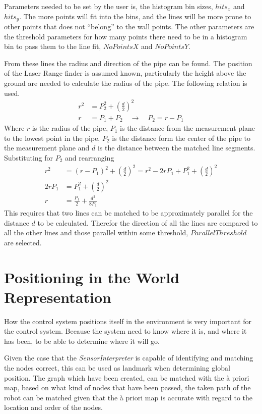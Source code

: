 Parameters needed to be set by the user is, the histogram bin sizes, $hits_x$ and
$hits_y$. The more points will fit into the bins, and the lines will be more prone to
other points that does not ``belong'' to the wall points. The other parameters are the
threshold parameters for how many points there need to be in a histogram bin to pass them
to the line fit, $NoPointsX$ and $NoPointsY$.

From these lines the radius and direction of the pipe can be found. The position of the
Laser Range finder is assumed known, particularly the height above the ground are needed
to calculate the radius of the pipe. The following relation is used.
\begin{align}
    r^2 &= P_2^2 + \left(\frac{d}{2} \right)^2 \\
    r &= P_1 + P_2  \quad \rightarrow \quad P_2 = r - P_1
\end{align}
       Where $r$ is the radius of the pipe, $P_1$ is the distance from the measurement plane to
the lowest point in the pipe, $P_2$ is the distance form the center of the pipe to the
measurement plane and $d$ is the distance between the matched line segments. Substituting
for $P_2$ and rearranging
\begin{equation}
    \begin{aligned}
        r^2& = (r - P_1)^2 + \left(\frac{d}{2}\right)^2 = r^2 - 2 r P_1 + P_1^2 +
        \left(\frac{d}{2}\right)^2 \\
        2 r P_1 &= P_1^2 + \left(\frac{d}{2}\right)^2 \\
        r &= \frac{P_1}{2} + \frac{d^2}{8 P_1}
    \end{aligned}
\end{equation}
This requires that two lines can be matched to be approximately parallel for the distance
$d$ to be calculated. Therefor the direction of all the lines are compared to all the
other lines and those parallel within some threshold, $ParallelThreshold$ are selected.


\section{Positioning in the World Representation}
How the control system positions itself in the environment is very important for the
control system. Because the system need to know where it is, and where it has been, to be
able to determine where it will go. 

Given the case that the \emph{SensorInterpreter} is capable of identifying and matching
the nodes correct, this can be used as landmark when determining global position. The
graph which have been created, can be matched with the \`a priori map, based on what kind
of nodes that have been passed, the taken path of the robot can be matched given that the
\`a priori map is accurate with regard to the location and order of the nodes. 

